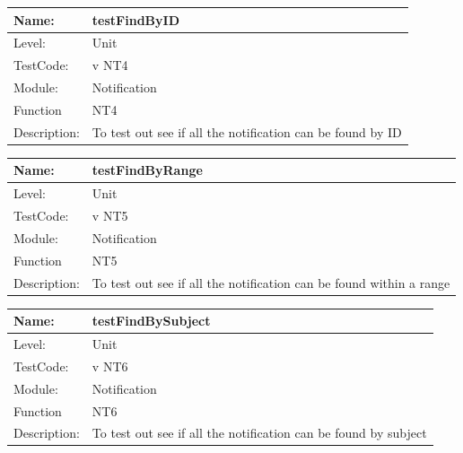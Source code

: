 \documentclass[12pt]{article}
\begin{document}
\begin{flushleft}
\begin{center}
\begin{tabular}{|l|p{12cm}|}
\end{tabular}
\end{center}

\begin{center}
\begin{tabular}{|l|p{12cm}|}
\hline

 Name: & testFindByID  \\
\hline
Level: & Unit \\
\hline
TestCode: & v NT4 \\
\hline
Module:& Notification\\
\hline
Function & NT4 \\
\hline
Description: & To test out see if all the notification can be found by ID \\
\hline

\end{tabular}
\end{center}

\begin{center}
\begin{tabular}{|l|p{12cm}|}
\hline

 Name: & testFindByRange  \\
\hline
Level: & Unit \\
\hline
TestCode: & v NT5 \\
\hline
Module:& Notification\\
\hline
Function & NT5 \\
\hline
Description: & To test out see if all the notification can be found within a range \\
\hline

\end{tabular}
\end{center}

\begin{center}
\begin{tabular}{|l|p{12cm}|}
\hline

 Name: & testFindBySubject  \\
\hline
Level: & Unit \\
\hline
TestCode: & v NT6 \\
\hline
Module:& Notification\\
\hline
Function & NT6 \\
\hline
Description: & To test out see if all the notification can be found by subject \\
\hline


\end{tabular}
\end{center}
\end{flushleft}
\end{document}

